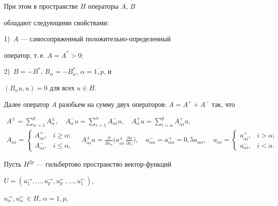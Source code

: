 При этом в пространстве $H$ операторы $A$, $B$ 


обладают следующими свойствами:


1)~$A$ --- самосопряженный положительно-определенный 


оператор, т.\,е. $A=A^*>0$; 


2)~$B=-B^*$, $B_\alpha=-B_\alpha^*$, $\alpha=\overline{1,p}$, и


$(B_\alpha u,u)=0$ для всех $u\in H$.





Далее оператор $A$ разобьем на сумму двух операторов: $A=A^++A^-$ так, что


\begin{gather*}


A^\pm=\sum\limits_{\alpha=1}^{p} A_\alpha^\pm, \quad 


A_\alpha^-u=\sum\limits_{i=1}^{\alpha}A^-_{\alpha i}u, \quad 


A_\alpha^+u=\sum\limits_{i=\alpha}^{p}A^+_{\alpha i}u, \\


%


A_{\alpha i}=\begin{cases}


A_{\alpha i}^+, & i\ge\alpha; \\ A_{\alpha i}^-, & i\le\alpha, \end{cases}


\quad


A_{\alpha i}^\pm u=\frac{\partial}{\partial x_\alpha}


\bigg(a_{\alpha i}^\pm\,\frac{\partial u}{\partial x_i}\bigg),


\quad a_{\alpha\alpha}^-=a_{\alpha\alpha}^+=0{,}5a_{\alpha\alpha}, \quad


a_{\alpha i}=\begin{cases}


a_{\alpha i}^+, & i>\alpha; \\ a_{\alpha i}^-, & i<\alpha. \end{cases}


\end{gather*}





Пусть $H^{2p}$ --- гильбертово пространство вектор-функций


$U=(u_1^\to,\dotsc,u_p^\to,u_p^\gets,\dotsc,u_1^\gets)$,


$u_\alpha^\to,u_\alpha^\gets\in H$, $\alpha=\overline{1,p}$,


